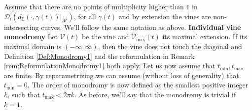 \documentclass[twoside,leqno]{article}
\newcommand{\M}{\mathcal{M}}
\newcommand{\Per}{\mathscr{D}}
\begin{document}
\begin{definition}
Assume that there are no points of multiplicity higher than $1$ in $\Per_l (d_\mathbb{E}(\cdot, \gamma(t) )|_\M)$, for all $\gamma(t)$ and by extension the vines are non-intersecting curves. We'll follow the same notation as above. 
\newline 
\textbf{Individual vine monodromy}
Let $\mathcal{V} (t)$ be the vine and $\tilde{\mathcal{V}}_{\max} (t)$ its maximal extension. If its maximal domain is $(-\infty ,\infty)$, then the vine does not touch the diagonal and Definition \ref{Def:Monodromy1} and the reformulation in Remark \ref{rem:ReformulationMonodromy1} both apply. 
Let us now assume that $t_{\min},t_{\max}$ are finite. By reparametrizing we can assume (without loss of generality) that $t_{\min}=0$. The order of monodromy is now defined as the smallest positive integer $k$, such that $t_{\max} <2 \pi k$. As before, we'll say that the monodromy is trivial if $k=1$. 
%


\end{definition}
\end{document}
